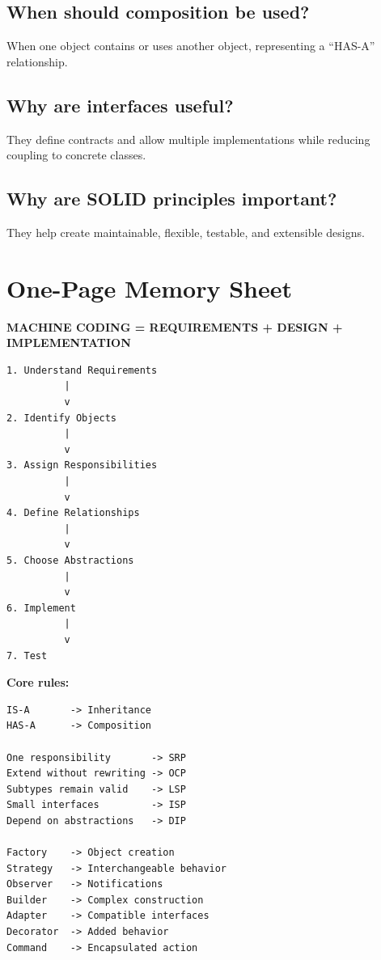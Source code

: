 \documentclass[12pt,a4paper]{article}
\begin{document}
\subsection*{When should composition be used?}
When one object contains or uses another object, representing a ``HAS-A'' relationship.

\subsection*{Why are interfaces useful?}
They define contracts and allow multiple implementations while reducing coupling to concrete classes.

\subsection*{Why are SOLID principles important?}
They help create maintainable, flexible, testable, and extensible designs.

\section{One-Page Memory Sheet}

\begin{center}
\textbf{\Large MACHINE CODING = REQUIREMENTS + DESIGN + IMPLEMENTATION}
\end{center}

\begin{verbatim}
1. Understand Requirements
          |
          v
2. Identify Objects
          |
          v
3. Assign Responsibilities
          |
          v
4. Define Relationships
          |
          v
5. Choose Abstractions
          |
          v
6. Implement
          |
          v
7. Test
\end{verbatim}

\textbf{Core rules:}

\begin{verbatim}
IS-A       -> Inheritance
HAS-A      -> Composition

One responsibility       -> SRP
Extend without rewriting -> OCP
Subtypes remain valid    -> LSP
Small interfaces         -> ISP
Depend on abstractions   -> DIP

Factory    -> Object creation
Strategy   -> Interchangeable behavior
Observer   -> Notifications
Builder    -> Complex construction
Adapter    -> Compatible interfaces
Decorator  -> Added behavior
Command    -> Encapsulated action
\end{verbatim}
\end{document}
